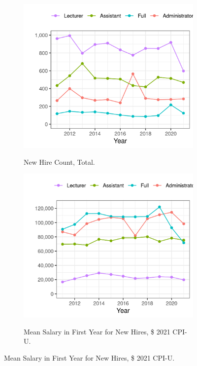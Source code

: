 \documentclass[notitlepage,12pt]{article}
\begin{document}
\begin{figure}[h!]
    \centering
    \singlespacing
    \caption{Trends in New Hires at Illinois Public Universities 2011-2021.}
    \begin{subfigure}[b]{0.495\textwidth}
        \centering
        \caption{New Hire Count, Total.}
        \includegraphics[width=\textwidth]{figures/newhire-count-illinois.png}
        \label{fig:newhire-count-illinois}
    \end{subfigure}
    \begin{subfigure}[b]{0.495\textwidth}
        \centering
        \caption{Mean Salary in First Year for New Hires, \$ 2021 CPI-U.}
        \includegraphics[width=\textwidth]{figures/newhire-salary-illinois.png}
        \label{fig:newhire-salary-illinois}
    \end{subfigure}
    \label{fig:newhire-illinois}
\end{figure}
\end{document}
